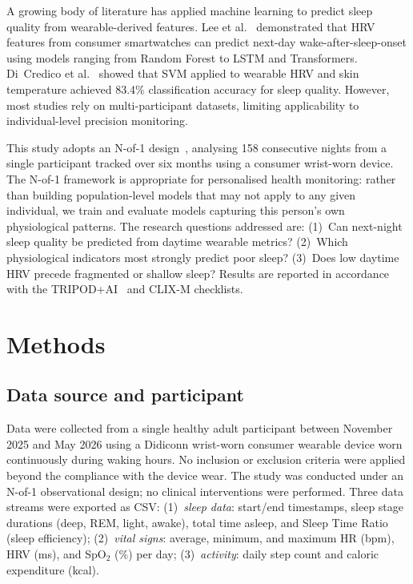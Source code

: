 \documentclass[fleqn,10pt]{wlscirep}
\begin{document}
A growing body of literature has applied machine learning to predict sleep quality from wearable-derived features. Lee et al.~\cite{lee2025} demonstrated that HRV features from consumer smartwatches can predict next-day wake-after-sleep-onset using models ranging from Random Forest to LSTM and Transformers. Di~Credico et al.~\cite{dicredico2024} showed that SVM applied to wearable HRV and skin temperature achieved 83.4\% classification accuracy for sleep quality. However, most studies rely on multi-participant datasets, limiting applicability to individual-level precision monitoring.

This study adopts an N-of-1 design~\cite{chen2024ml}, analysing 158 consecutive nights from a single participant tracked over six months using a consumer wrist-worn device. The N-of-1 framework is appropriate for personalised health monitoring: rather than building population-level models that may not apply to any given individual, we train and evaluate models capturing this person's own physiological patterns. The research questions addressed are: (1)~Can next-night sleep quality be predicted from daytime wearable metrics? (2)~Which physiological indicators most strongly predict poor sleep? (3)~Does low daytime HRV precede fragmented or shallow sleep? Results are reported in accordance with the TRIPOD+AI~\cite{tripodai} and CLIX-M checklists.

\section*{Methods}

\subsection*{Data source and participant}
Data were collected from a single healthy adult participant between November 2025 and May 2026 using a Didiconn wrist-worn consumer wearable device worn continuously during waking hours. No inclusion or exclusion criteria were applied beyond the compliance with the device wear. The study was conducted under an N-of-1 observational design; no clinical interventions were performed. Three data streams were exported as CSV: (1)~\textit{sleep data}: start/end timestamps, sleep stage durations (deep, REM, light, awake), total time asleep, and Sleep Time Ratio (sleep efficiency); (2)~\textit{vital signs}: average, minimum, and maximum HR (bpm), HRV (ms), and SpO$_2$ (\%) per day; (3)~\textit{activity}: daily step count and caloric expenditure (kcal).
\end{document}
